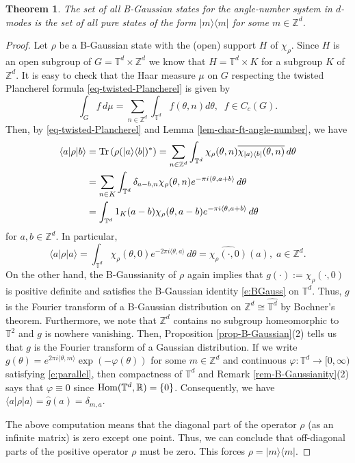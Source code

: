 \documentclass[12pt,reqno]{amsart}
\newtheorem{thm}{Theorem}
\theoremstyle{definition}
\theoremstyle{definition}
\theoremstyle{definition}
\numberwithin{thm}{section}
\numberwithin{equation}{section}
\newcommand{\Real}{\mathbb R}
\newcommand{\la}{\langle}
\newcommand{\ra}{\rangle}
\newcommand{\tor}{\mathbb{T}}
\newcommand{\z}{\mathbb{Z}}
\newcommand{\tr}{{\rm Tr}\,}
\begin{document}
\begin{thm}\label{thm-B-GaussianState-ch}
The set of all B-Gaussian states for the angle-number system in $d$-modes is the set of all pure states of the form $|m \ra \la m|$ for some $m\in \z^d$.
\end{thm}
\begin{proof}
Let $\rho$ be a B-Gaussian state with the (open) support $H$ of $\chi_\rho$. Since $H$ is an open subgroup of $G = \tor^d \times \z^d$ we know that $H = \tor^d \times K$ for a subgroup $K$ of $\z^d$. It is easy to check that the Haar measure $\mu$ on $G$ respecting the twisted Plancherel formula \eqref{eq-twisted-Plancherel} is given by
    $$\int_G f\, d\mu = \sum_{n\in \z^d}\int_{\tor^d} f(\theta, n) d\theta,\;\; f\in C_c(G).$$
Then, by \eqref{eq-twisted-Plancherel} and Lemma \ref{lem-char-ft-angle-number}, we have
\begin{align*}
    \la a|\rho|b \ra &= \tr (\rho (|a\ra\la b|)^*) = \sum_{n\in \z^d}\int_{\tor^d} \chi_{\rho}(\theta,n) \overline{\chi_{|a\ra\la b|}(\theta,n)}\,d\theta\\
    &=\sum_{n\in K}\int_{\tor^d} \delta_{a-b,n} \chi_{\rho}(\theta,n) e^{-\pi i\la\theta,a+b\ra}\,d\theta\\
    &=\int_{\tor^d} 1_K(a-b) \chi_{\rho}(\theta,a-b)e^{-\pi i\la\theta,a+b\ra}\,d\theta
\end{align*}
for $a,b\in \z^d$.
In particular,
    $$\la a|\rho|a \ra = \int_{\tor^d} \chi_\rho(\theta,0) e^{-2\pi i \la \theta,a \ra}\,d\theta = \widehat{\chi_{\rho}(\cdot,0)}(a),\; a\in \z^d.$$
On the other hand, the B-Gaussianity of $\rho$ again implies that $g(\cdot):=\chi_\rho(\cdot,0)$ is positive definite and satisfies the B-Gaussian identity  \eqref{e:BGauss} on $\tor^d$. Thus, $g$ is the Fourier transform of a B-Gaussian distribution on $\z^d\cong \widehat{\tor^d}$ by Bochner's theorem. Furthermore, we note that $\z^d$ contains no subgroup homeomorphic to $\tor^2$ and $g$ is nowhere vanishing. Then, Proposition \ref{prop-B-Gaussian}(2) tells us that $g$ is the Fourier transform of a Gaussian distribution. If we write $g(\theta)=e^{2\pi i\la \theta, m \ra}\exp(-\varphi(\theta))$ for some $m\in \z^d$ and continuous $\varphi:\tor^d\to [0,\infty)$ satisfying \eqref{e:parallel}, then compactness of $\tor^d$ and Remark \ref{rem-B-Gaussianity}(2) says that $\varphi\equiv 0$ since ${\rm Hom}(\tor^d, \Real) = \{0\}$. Consequently, we have $\la a|\rho|a\ra =\hat{g}(a)=\delta_{m,a}$.

The above computation means that the diagonal part of the operator $\rho$ (as an infinite matrix) is zero except one point. Thus, we can conclude that off-diagonal parts of the positive operator $\rho$ must be zero. This forces $\rho = |m\ra \la m|$.

\end{proof}
\end{document}
